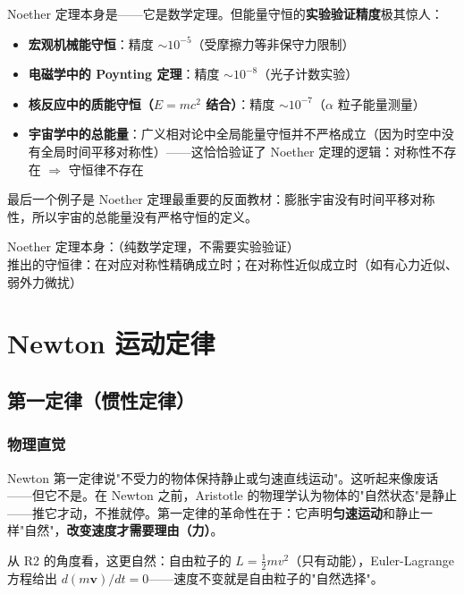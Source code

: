 \begin{oombox}
  Noether 定理本身是\precexact——它是数学定理。但能量守恒的\textbf{实验验证精度}极其惊人：
  \begin{itemize}
    \item \textbf{宏观机械能守恒}：精度 $\sim 10^{-5}$（受摩擦力等非保守力限制）
    \item \textbf{电磁学中的 Poynting 定理}：精度 $\sim 10^{-8}$（光子计数实验）
    \item \textbf{核反应中的质能守恒（$E=mc^2$ 结合）}：精度 $\sim 10^{-7}$（$\alpha$ 粒子能量测量）
    \item \textbf{宇宙学中的总能量}：广义相对论中全局能量守恒并不严格成立（因为时空中没有全局时间平移对称性）——这恰恰验证了 Noether 定理的逻辑：对称性不存在 $\Rightarrow$ 守恒律不存在
  \end{itemize}
  最后一个例子是 Noether 定理最重要的反面教材：膨胀宇宙没有时间平移对称性，所以宇宙的总能量没有严格守恒的定义。
\end{oombox}

\precisionbox[精度等级]
  Noether 定理本身：\precexact（纯数学定理，不需要实验验证）\\
  推出的守恒律：\precexact 在对应对称性精确成立时；\precisionapprox 在对称性近似成立时（如有心力近似、弱外力微扰）
\endprecisionbox

\section{Newton 运动定律}

\subsection{第一定律（惯性定律）}

\subsubsection{物理直觉}

Newton 第一定律说"不受力的物体保持静止或匀速直线运动"。这听起来像废话——但它不是。在 Newton 之前，Aristotle 的物理学认为物体的"自然状态"是静止——推它才动，不推就停。第一定律的革命性在于：它声明\textbf{匀速运动}和静止一样"自然"，\textbf{改变速度才需要理由（力）}。

从 R2 的角度看，这更自然：自由粒子的 $L = \frac{1}{2}mv^2$（只有动能），Euler-Lagrange 方程给出 $d(m\mathbf{v})/dt = 0$——速度不变就是自由粒子的"自然选择"。

